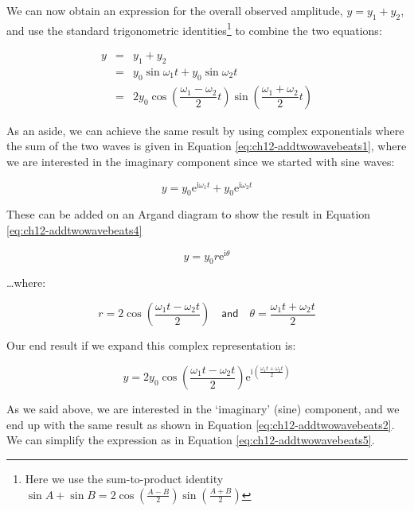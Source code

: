 \documentclass[
]{book}
\begin{document}
We can now obtain an expression for the overall observed amplitude, \(y = y_1 + y_2\), and use the standard trigonometric identities\footnote{Here we use the sum-to-product identity \(\sin A + \sin B = 2\cos \left(\frac{A-B}{2}\right) \sin\left(\frac{A+B}{2}\right)\)} to combine the two equations:

\begin{equation}
\begin{array}{rcl}
y &=& y_1 + y_2 \\
 &=& y_{0} \sin \omega_{1} t +  y_{0} \sin \omega_{2} t \\
 &=& 2y_{0}\cos\left(\dfrac{\omega_{1}-\omega_{2}}{2}t\right)\sin\left(\dfrac{\omega_{1}+\omega_{2}}{2}t\right)
\end{array}
\label{eq:ch12-addtwowavebeats2}
\end{equation}

As an aside, we can achieve the same result by using complex exponentials where the sum of the two waves is given in Equation \eqref{eq:ch12-addtwowavebeats1}, where we are interested in the imaginary component since we started with sine waves:

\begin{equation}
y = y_0 \mathrm{e}^{\mathrm{i}\omega_1 t} + y_0\mathrm{e}^{\mathrm{i}\omega_2 t}
\label{eq:ch12-addtwowavebeats3}
\end{equation}

These can be added on an Argand diagram to show the result in Equation \eqref{eq:ch12-addtwowavebeats4}

\begin{equation}
y = y_0 r\mathrm{e}^{\mathrm{i}\theta}
\label{eq:ch12-addtwowavebeats4}
\end{equation}

\ldots where:

\begin{equation}
r = 2 \cos\left(\frac{\omega_1t - \omega_2t}{2}\right) \quad \textsf{and} \quad \theta = \frac{\omega_1 t + \omega_2 t}{2}
\end{equation}

Our end result if we expand this complex representation is:

\begin{equation}
y = 2 y_0 \cos \left( \frac{\omega_1t - \omega_2t}{2} \right) \mathrm{e}^{\mathrm{i}\left(\frac{\omega_1 t + \omega_2t}{2} \right)}
\end{equation}

As we said above, we are interested in the `imaginary' (sine) component, and we end up with the same result as shown in Equation \eqref{eq:ch12-addtwowavebeats2}. We can simplify the expression as in Equation \eqref{eq:ch12-addtwowavebeats5}.
\end{document}
